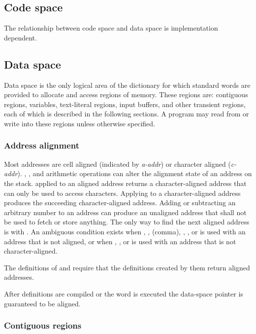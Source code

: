 \subsection{Code space} %

The relationship between code space and data space is implementation
dependent.

\subsection{Data space} %
\label{usage:dataspace}

Data space is the only logical area of the dictionary for which
standard words are provided to allocate and access regions of
memory. These regions are: contiguous regions, variables,
text-literal regions, input buffers, and other transient regions,
each of which is described in the following sections. A program may
read from or write into these regions unless otherwise specified.

\subsubsection{Address alignment} %
\label{usage:aaddr}

Most addresses are cell aligned (indicated by \emph{a-addr}) or character
aligned (\emph{c-addr}).
, , and arithmetic operations can alter
the alignment state of an address on the stack.  applied
to an aligned address returns a character-aligned address that can
only be used to access characters. Applying  to a
character-aligned address produces the succeeding character-aligned
address. Adding or subtracting an arbitrary number to an address can
produce an unaligned address that shall not be used to fetch or
store anything. The only way to find the next aligned address is
with . An ambiguous condition exists when
, \word{!}, \word{,} (comma), \word{+!}, , or
 is used with an address that is not aligned, or when
, , or  is used with an address that is
not character-aligned.

The definitions of  and
 require that the definitions created
by them return aligned addresses.

After definitions are compiled or the word  is executed
the data-space pointer is guaranteed to be aligned.

\subsubsection{Contiguous regions} %
\label{usage:contiguous}

